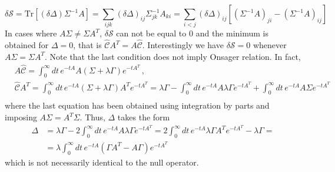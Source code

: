 \documentclass[12pt]{iopart}
\newcommand{\lx} {\left}
\newcommand{\rx} {\right}
\newcommand{\cS} {\mathcal{S}}
\newcommand{\cC} {\mathcal{C}}
\begin{document}
\begin{equation}
\delta \cS = \text{Tr}\lx[(\delta\Delta) \Sigma^{-1}A\rx]=\sum_{ijk}(\delta\Delta)_{ij}\Sigma_{jk}^{-1}A_{ki}=\sum_{i<j}(\delta\Delta)_{ij}\lx[\lx(\Sigma^{-1}A\rx)_{ji}-\lx(\Sigma^{-1}A\rx)_{ij}\rx]
\end{equation}
In cases where $A\Sigma\neq\Sigma A^T$, $\delta \cS$ can not be equal to $0$ and the minimum is obtained for $\Delta =0$, that is $\widehat{\cC}A^T=A\widehat{\cC}$. Interestingly we have $\delta \cS=0$ whenever $A\Sigma=\Sigma A^T$. Note that the last condition does not imply Onsager relation. In fact,
\begin{align}
&A\widehat{\cC}=\int_0^\infty dt \, e^{-tA} A\lx(\Sigma+\lambda\Gamma\rx) e^{-t A^T}\,,\\
&\widehat{\cC}A^T=\int_0^\infty dt \, e^{-tA} \lx(\Sigma+\lambda\Gamma\rx)A^T e^{-t A^T}=\lambda\Gamma-\int_0^\infty dt \, e^{-tA} A\lambda\Gamma e^{-t A^T}+\int_0^\infty dt \, e^{-tA} A\Sigma e^{-t A^T}\\
\end{align}
where the last equation has been obtained using integration by parts and imposing $A\Sigma=A^T\Sigma$. Thus, $\Delta$ takes the form
\begin{align}
\Delta&= \lambda\Gamma-2 \int_0^\infty dt \, e^{-tA} A\lambda\Gamma e^{-t A^T}=2 \int_0^\infty dt \, e^{-tA} \lambda\Gamma A^T e^{-t A^T}-\lambda \Gamma =\nonumber\\
&=\lambda \int_0^\infty dt \, e^{-tA} \lx(\Gamma A^T- A\Gamma\rx)e^{-t A^T}
\end{align}
which is not necessarily identical to the null operator.
\end{document}
